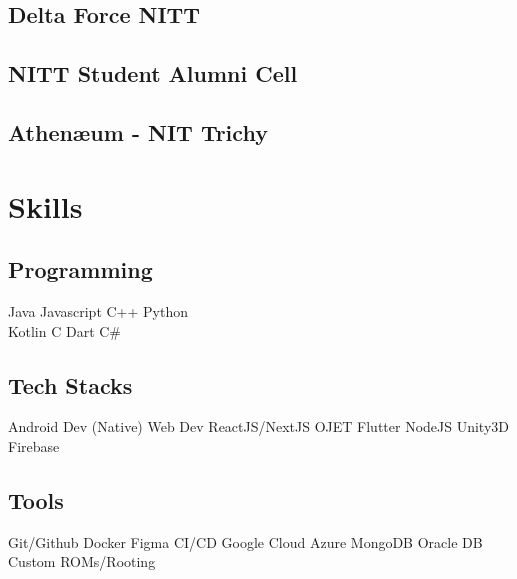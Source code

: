 \documentclass[]{deedy-resume-openfont}
\begin{document}
\begin{minipage}[t]{0.3\textwidth}
\subsection{Delta Force NITT}
\sectionsep

\subsection{NITT Student Alumni Cell}
\sectionsep

\subsection{Athenæum - NIT Trichy}
\sectionsep

\section{Skills}

\subsection{Programming}
Java  \textbullet{} Javascript C++ \textbullet{} Python  \\
Kotlin \textbullet{} C \textbullet{} Dart \textbullet{} C\# \\ 
\sectionsep

\subsection{Tech Stacks}
Android Dev (Native) \textbullet{}   Web Dev  ReactJS/NextJS \textbullet{} OJET
\textbullet{} Flutter  NodeJS  \textbullet{} Unity3D \textbullet{} Firebase 
\sectionsep

\subsection{Tools}
Git/Github  \textbullet{} Docker \textbullet{} Figma \textbullet{} CI/CD
\textbullet{} Google Cloud \textbullet{} Azure \textbullet{} MongoDB \textbullet{} Oracle DB
\textbullet{} Custom ROMs/Rooting \\ 

\end{minipage} 
\end{document}
